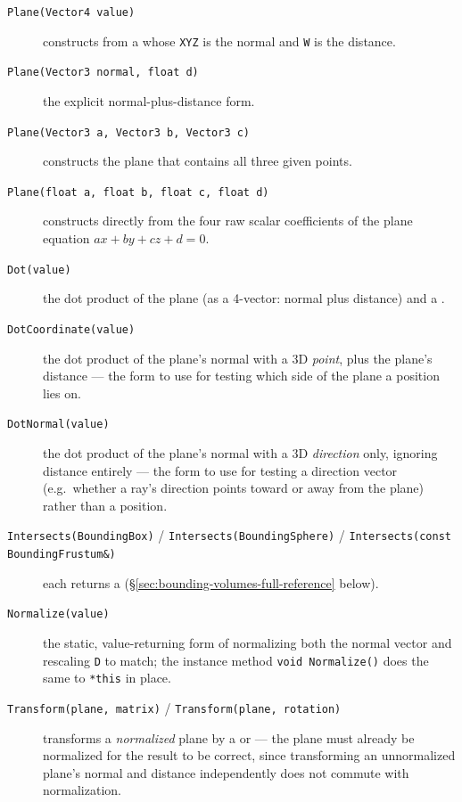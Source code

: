 \begin{description}
\item[\texttt{Plane(Vector4 value)}] constructs from a  whose \texttt{XYZ}
  is the normal and \texttt{W} is the distance.
\item[\texttt{Plane(Vector3 normal, float d)}] the explicit normal-plus-distance form.
\item[\texttt{Plane(Vector3 a, Vector3 b, Vector3 c)}] constructs the plane that contains all
  three given points.
\item[\texttt{Plane(float a, float b, float c, float d)}] constructs directly from the four raw
  scalar coefficients of the plane equation $ax + by + cz + d = 0$.
\item[\texttt{Dot(value)}] the dot product of the plane (as a 4-vector: normal plus distance)
  and a .
\item[\texttt{DotCoordinate(value)}] the dot product of the plane's normal with a 3D
  \emph{point}, plus the plane's distance --- the form to use for testing which side of the
  plane a position lies on.
\item[\texttt{DotNormal(value)}] the dot product of the plane's normal with a 3D
  \emph{direction} only, ignoring distance entirely --- the form to use for testing a direction
  vector (e.g.\ whether a ray's direction points toward or away from the plane) rather than a
  position.
\item[\texttt{Intersects(BoundingBox)} / \texttt{Intersects(BoundingSphere)} /
  \texttt{Intersects(const BoundingFrustum\&)}] each returns a 
  (\S\ref{sec:bounding-volumes-full-reference} below).
\item[\texttt{Normalize(value)}] the static, value-returning form of normalizing both the
  normal vector and rescaling \texttt{D} to match; the instance method \texttt{void
  Normalize()} does the same to \texttt{*this} in place.
\item[\texttt{Transform(plane, matrix)} / \texttt{Transform(plane, rotation)}] transforms a
  \emph{normalized} plane by a  or  --- the plane must
  already be normalized for the result to be correct, since transforming an unnormalized
  plane's normal and distance independently does not commute with normalization.
\end{description}

